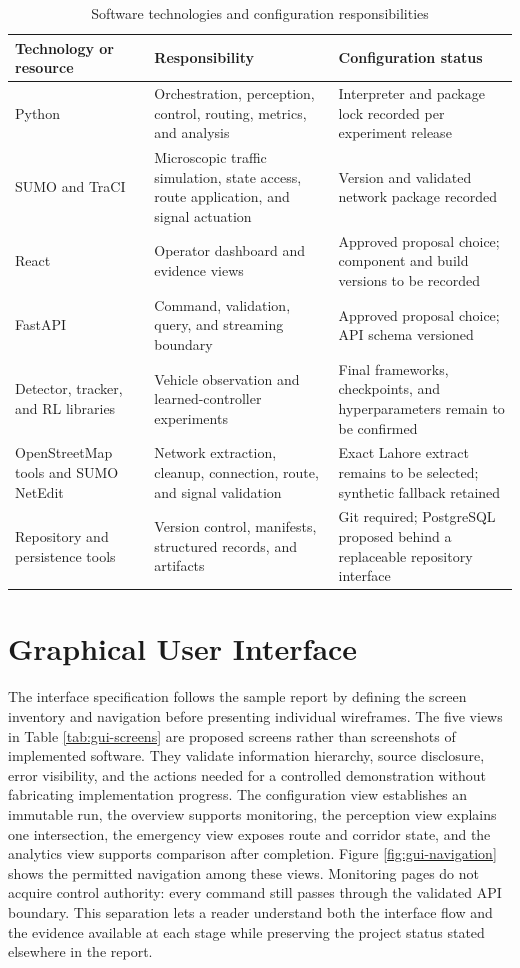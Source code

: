 \begin{table}[htbp]
\centering
\caption{Software technologies and configuration responsibilities}
\label{tab:software}
\begin{tabularx}{\textwidth}{p{}p{}Y}
\toprule
\textbf{Technology or resource} & \textbf{Responsibility} & \textbf{Configuration status}\\
\midrule
Python & Orchestration, perception, control, routing, metrics, and analysis & Interpreter and package lock recorded per experiment release\\
SUMO and TraCI & Microscopic traffic simulation, state access, route application, and signal actuation & Version and validated network package recorded\\
React & Operator dashboard and evidence views & Approved proposal choice; component and build versions to be recorded\\
FastAPI & Command, validation, query, and streaming boundary & Approved proposal choice; API schema versioned\\
Detector, tracker, and RL libraries & Vehicle observation and learned-controller experiments & Final frameworks, checkpoints, and hyperparameters remain to be confirmed\\
OpenStreetMap tools and SUMO NetEdit & Network extraction, cleanup, connection, route, and signal validation & Exact Lahore extract remains to be selected; synthetic fallback retained\\
Repository and persistence tools & Version control, manifests, structured records, and artifacts & Git required; PostgreSQL proposed behind a replaceable repository interface\\
\bottomrule
\end{tabularx}
\end{table}

\section{Graphical User Interface}
\label{sec:gui}

The interface specification follows the sample report by defining the screen inventory and navigation before presenting individual wireframes. The five views in Table \ref{tab:gui-screens} are proposed screens rather than screenshots of implemented software. They validate information hierarchy, source disclosure, error visibility, and the actions needed for a controlled demonstration without fabricating implementation progress. The configuration view establishes an immutable run, the overview supports monitoring, the perception view explains one intersection, the emergency view exposes route and corridor state, and the analytics view supports comparison after completion. Figure \ref{fig:gui-navigation} shows the permitted navigation among these views. Monitoring pages do not acquire control authority: every command still passes through the validated API boundary. This separation lets a reader understand both the interface flow and the evidence available at each stage while preserving the project status stated elsewhere in the report.

